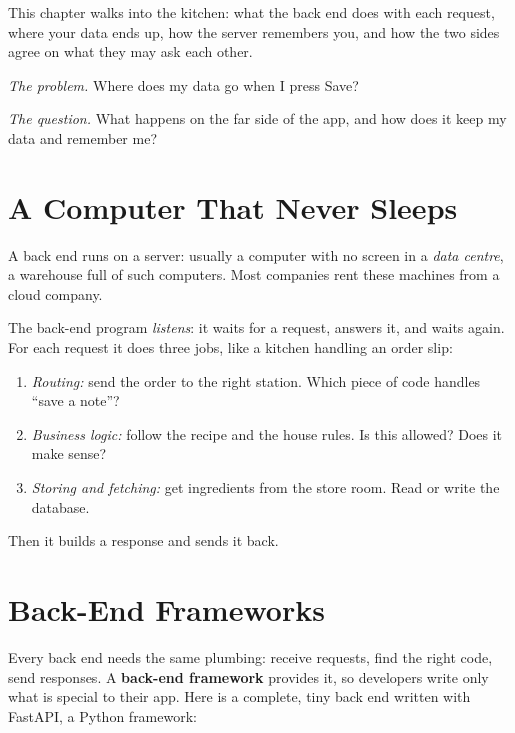 
\begin{chapterintro}

This chapter walks into the kitchen: what the back end does with each request, where your data ends up, how the server remembers you, and how the two sides agree on what they may ask each other.

\end{chapterintro}

\emph{The problem.} Where does my data go when I press Save?

\emph{The question.} What happens on the far side of the app, and how does it keep my data and remember me?

\section{A Computer That Never Sleeps}\label{03-the-back-end:a-computer-that-never-sleeps}

A back end runs on a server: usually a computer with no screen in a \emph{data centre}, a warehouse full of such computers. Most companies rent these machines from a cloud company.

The back-end program \emph{listens}: it waits for a request, answers it, and waits again. For each request it does three jobs, like a kitchen handling an order slip:

\begin{enumerate}
\def\labelenumi{\arabic{enumi}.}
\tightlist
\item
  \emph{Routing:} send the order to the right station. Which piece of code handles ``save a note''?
\item
  \emph{Business logic:} follow the recipe and the house rules. Is this allowed? Does it make sense?
\item
  \emph{Storing and fetching:} get ingredients from the store room. Read or write the database.
\end{enumerate}

Then it builds a response and sends it back.

\section{Back-End Frameworks}\label{03-the-back-end:back-end-frameworks}

Every back end needs the same plumbing: receive requests, find the right code, send responses. A \textbf{back-end framework} provides it, so developers write only what is special to their app. Here is a complete, tiny back end written with FastAPI, a Python framework:

